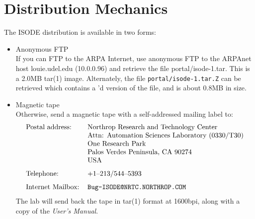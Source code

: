 
\section	{Distribution Mechanics}\label{distribution}
The ISODE distribution is available in two forms:
\begin{itemize}
\item	Anonymous FTP\\
If you can FTP to the ARPA Internet,
use anonymous FTP to the ARPAnet host louie.udel.edu (10.0.0.96) and retrieve
the file portal/isode-1.tar.
This is a 2.0MB \man tar(1) image.
Alternately,
the file \verb"portal/isode-1.tar.Z" can be retrieved which contains a
'd version of the  file,
and is about 0.8MB in size.

\item	Magnetic tape\\
Otherwise, send a magnetic tape with a self-addressed mailing label to:
\[\begin{tabular}{ll}
Postal address:&	Northrop Research and Technology Center\\
&			Attn: Automation Sciences Laboratory (0330/T30)\\
&			One Research Park\\
&			Palos Verdes Peninsula, CA  90274\\
&			USA\\[0.1in]
Telephone:&		+1--213/544--5393\\[0.1in]
Internet Mailbox:&	\tt Bug-ISODE@NRTC.NORTHROP.COM
\end{tabular}\]
The lab will send back the tape in \man tar(1) format at 1600bpi,
along with a copy of the {\em User's Manual}.
\end{itemize}
